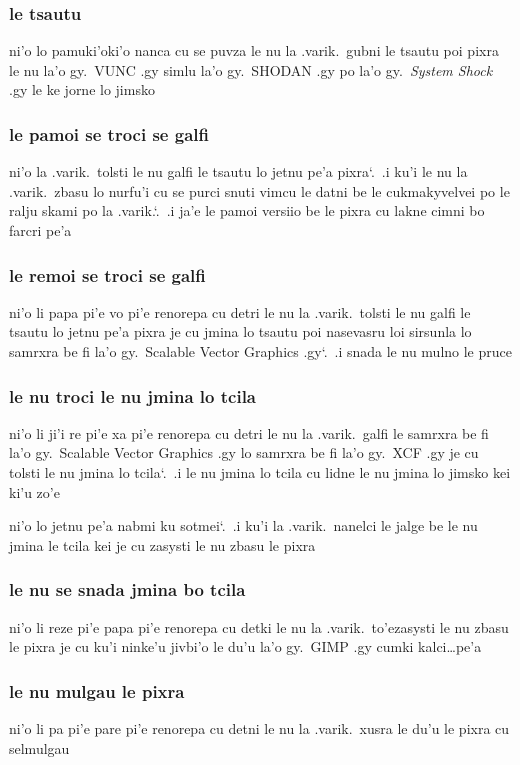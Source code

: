 \documentclass{report}
\newcommand\sds{\spacefactor\sfcode`.\ \space}
\begin{document}
\subsubsection{le tsautu}
ni'o lo pamuki'oki'o nanca cu se puvza le nu la .varik.\ gubni le tsautu poi pixra le nu la'o gy.\ VUNC .gy simlu la'o gy.\ SHODAN .gy po la'o gy.\ \textit{System Shock} .gy le ke jorne lo jimsko

\subsubsection{le pamoi se troci se galfi}
ni'o la .varik.\ tolsti le nu galfi le tsautu lo jetnu pe'a pixra\sds  .i ku'i le nu la .varik.\ zbasu lo nurfu'i cu se purci snuti vimcu le datni be le cukmakyvelvei po le ralju skami po la .varik.\sds  .i ja'e le pamoi versiio be le pixra cu lakne cimni bo farcri pe'a

\subsubsection{le remoi se troci se galfi}
ni'o li papa pi'e vo pi'e renorepa cu detri le nu la .varik.\ tolsti le nu galfi le tsautu lo jetnu pe'a pixra je cu jmina lo tsautu poi nasevasru loi sirsunla lo samrxra be fi la'o gy.\ Scalable Vector Graphics .gy\sds  .i snada le nu mulno le pruce

\subsubsection{le nu troci le nu jmina lo tcila}
ni'o li ji'i re pi'e xa pi'e renorepa cu detri le nu la .varik.\ galfi le samrxra be fi la'o gy.\ Scalable Vector Graphics .gy lo samrxra be fi la'o gy.\ XCF .gy je cu tolsti le nu jmina lo tcila\sds  .i le nu jmina lo tcila cu lidne le nu jmina lo jimsko kei ki'u zo'e

ni'o lo jetnu pe'a nabmi ku sotmei\sds  .i ku'i la .varik.\ nanelci le jalge be le nu jmina le tcila kei je cu zasysti le nu zbasu le pixra

\subsubsection{le nu se snada jmina bo tcila}
ni'o li reze pi'e papa pi'e renorepa cu detki le nu la .varik.\ to'ezasysti le nu zbasu le pixra je cu ku'i ninke'u jivbi'o le du'u la'o gy.\ GIMP .gy cumki kalci\ldots pe'a

\subsubsection{le nu mulgau le pixra}
ni'o li pa pi'e pare pi'e renorepa cu detni le nu la .varik.\ xusra le du'u le pixra cu selmulgau
\end{document}
